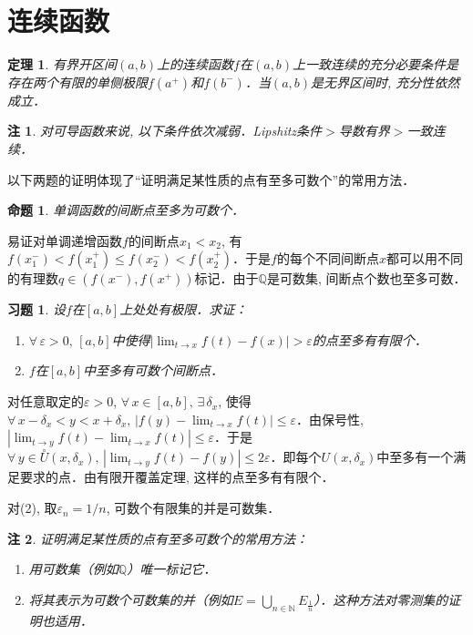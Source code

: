 \documentclass[11pt,a4paper]{ctexart}
\makeatletter
\theoremstyle{thmseries} %
\newtheorem{thm}{定理}[section]
\newtheorem{prop}{命题}[section]
\theoremstyle{exerseries}
\newtheorem{exer}{习题}[section]
\newtheorem*{rem}{注}
\renewenvironment{proof}[1][\proofname]{\par
  \pushQED{\qed}%
  \normalfont \topsep6\p@\@plus6\p@\relax
  \trivlist
  \item[\hskip\labelsep
        \itshape
    #1\@addpunct{}]\ignorespaces
}{%
  \popQED\endtrivlist\@endpefalse
}
\newenvironment{pf}{\begin{proof}[\bfseries\upshape 证\quad]}{\end{proof}}
\newcommand{\bra}[1]{\mathopen{}\left(#1\right)}
\renewcommand{\epsilon}{\varepsilon}
\newcommand{\dnei}{\overset{\circ}{U}}
\newcommand{\N}{\mathbb{N}}
\newcommand{\Q}{\mathbb{Q}}
\makeatother
\begin{document}
\section{连续函数}
\begin{thm}
	有界开区间$(a,b)$上的连续函数$f$在$(a,b)$上一致连续的充分必要条件是存在两个有限的单侧极限$f(a^+)$和$f(b^-)$．当$(a,b)$是无界区间时, 充分性依然成立．
\end{thm}
\begin{rem}
	对可导函数来说, 以下条件依次减弱．Lipshitz条件$>$导数有界$>$一致连续．
\end{rem}


以下两题的证明体现了``证明满足某性质的点有至多可数个''的常用方法．
\begin{prop}
	单调函数的间断点至多为可数个．
\end{prop}
\begin{pf}
	易证对单调递增函数$f$的间断点$x_1<x_2$, 有$f(x_1^-)<f(x_1^+)\leq f(x_2^-)<f(x_2^+)$．于是$f$的每个不同间断点$x$都可以用不同的有理数$q\in\bra{f(x^-),f(x^+)}$标记．由于$\Q$是可数集, 间断点个数也至多可数．
\end{pf}

\begin{exer}
	设$f$在$[a,b]$上处处有极限．求证：
	\begin{enumerate}
		\item $\forall\,\epsilon>0,\,[a,b]$中使得$|\lim_{t\to x}f(t)-f(x)|>\epsilon$的点至多有有限个．
		\item $f$在$[a,b]$中至多有可数个间断点．
	\end{enumerate}
\end{exer}
\begin{pf}
	对任意取定的$\epsilon>0$, $\forall\,x\in[a,b],\,\exists\,\delta_x$, 使得$\forall\,x-\delta_x<y<x+\delta_x,\,|f(y)-\lim_{t\to x}f(t)|\leq\epsilon$．由保号性, $|\lim_{t\to y}f(t)-\lim_{t\to x}f(t)|\leq\epsilon$．于是$\forall\,y\in\dnei(x,\delta_x),\,|\lim_{t\to y}f(t)-f(y)|\leq2\epsilon$．即每个$U(x,\delta_x)$中至多有一个满足要求的点．由有限开覆盖定理, 这样的点至多有有限个．

	对(2), 取$\epsilon_n=1/n$, 可数个有限集的并是可数集．
\end{pf}
\begin{rem}
	证明满足某性质的点有至多可数个的常用方法：
	\begin{enumerate}
		\item 用可数集（例如$\Q$）唯一标记它．
		\item 将其表示为可数个可数集的并（例如$E=\bigcup_{n\in \N}E_{\frac{1}{n}}$）．这种方法对零测集的证明也适用．
	\end{enumerate}
\end{rem}
\end{document}
